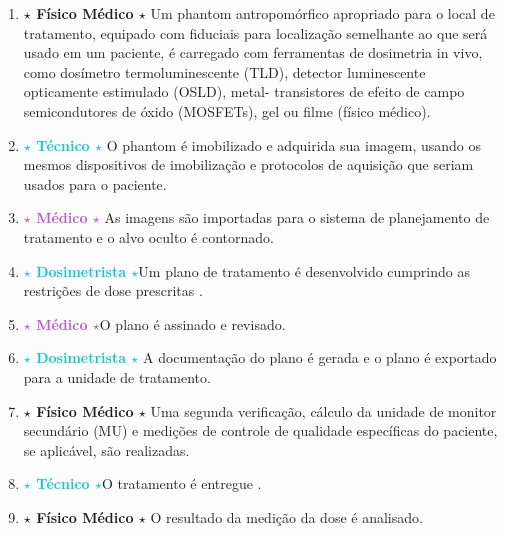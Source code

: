 \documentclass[11pt,a4paper]{article}
\begin{document}
	\begin{enumerate}[label=\LobsterTwo\textbf{\textcolor{CarnationPink}{\arabic*${}^\circ$}}]
		\item \LobsterTwo\textbf{\textcolor{CarnationPink}{$\star$ Físico Médico $\star$}} Um phantom  antropomórfico apropriado para o local de tratamento, equipado com fiduciais para localização semelhante ao que será usado em um paciente, é carregado com ferramentas de dosimetria in vivo, como dosímetro termoluminescente (TLD), detector luminescente opticamente estimulado (OSLD), metal- transistores de efeito de campo semicondutores de óxido (MOSFETs), gel ou filme (físico médico).
		
		\item \LobsterTwo\textbf{\textcolor{DarkTurquoise}{$\star$ Técnico $\star$}} O phantom é imobilizado e adquirida sua imagem, usando os mesmos dispositivos de imobilização e protocolos de aquisição que seriam usados para o paciente.
		
		\item \LobsterTwo\textbf{\textcolor{MediumOrchid}{$\star$ Médico $\star$}} As imagens são importadas para o sistema de planejamento de tratamento e o alvo oculto é contornado.
		
		\item \LobsterTwo\textbf{\textcolor{DarkTurquoise}{$\star$ Dosimetrista $\star$}}Um plano de tratamento é desenvolvido cumprindo as restrições de dose prescritas .
		
		\item \LobsterTwo\textbf{\textcolor{MediumOrchid}{$\star$ Médico $\star$}}O plano é assinado e revisado.
		
		\item \LobsterTwo\textbf{\textcolor{DarkTurquoise}{$\star$ Dosimetrista $\star$}} A documentação do plano é gerada e o plano é exportado para a unidade de tratamento.
		
		\item \LobsterTwo\textbf{\textcolor{CarnationPink}{$\star$ Físico Médico $\star$}} Uma segunda verificação, cálculo da unidade de monitor secundário (MU) e medições de controle de qualidade específicas do paciente, se aplicável, são realizadas.
		
		\item \LobsterTwo\textbf{\textcolor{DarkTurquoise}{$\star$ Técnico $\star$}}O tratamento é entregue .
		\item \LobsterTwo\textbf{\textcolor{CarnationPink}{$\star$ Físico Médico $\star$}} O resultado da medição da dose é analisado.
	\end{enumerate}
\end{document}
